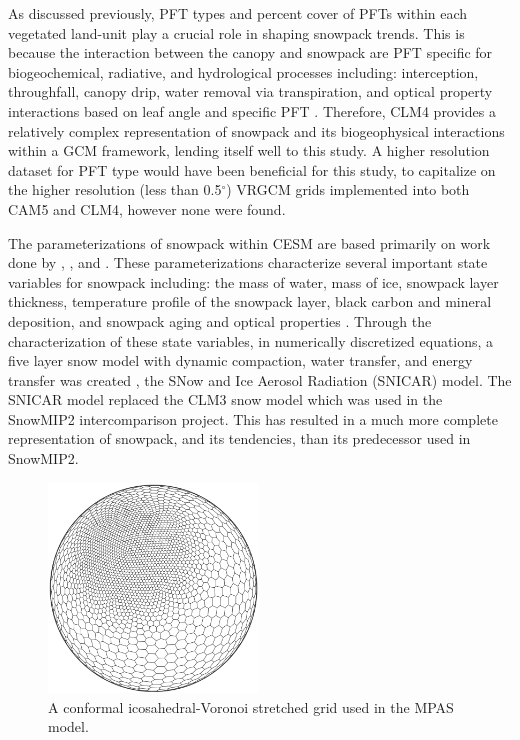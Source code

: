 \documentclass[11pt]{article}
\begin{document}
As discussed previously, PFT types and percent cover of PFTs within each vegetated land-unit play a crucial role in shaping snowpack trends. This is because the interaction between the canopy and snowpack are PFT specific for biogeochemical, radiative, and hydrological processes including: interception, throughfall, canopy drip, water removal via transpiration, and optical property interactions based on leaf angle and specific PFT \citep{lawrence2011parameterization}.  Therefore, CLM4 provides a relatively complex representation of snowpack and its biogeophysical interactions within a GCM framework, lending itself well to this study.   A higher resolution dataset for PFT type would have been beneficial for this study, to capitalize on the higher resolution (less than 0.5$^\circ$) VRGCM grids implemented into both CAM5 and CLM4, however none were found.

The parameterizations of snowpack within CESM are based primarily on work done by \citet{anderson1976point}, \citet{jordan1991one}, and \citet{yongjiu1997land}. These parameterizations characterize several important state variables for snowpack including: the mass of water, mass of ice, snowpack layer thickness, temperature profile of the snowpack layer, black carbon and mineral deposition, and snowpack aging and optical properties \citep{lawrence2011parameterization}. Through the characterization of these state variables, in numerically discretized equations, a five layer snow model with dynamic compaction, water transfer, and energy transfer was created \citep{lawrence2011parameterization}, the SNow and Ice Aerosol Radiation (SNICAR) model.  The SNICAR model replaced the CLM3 snow model which was used in the SnowMIP2 intercomparison project.  This has resulted in a much more complete representation of snowpack, and its tendencies, than its predecessor used in SnowMIP2.

\begin{figure}
\centering\includegraphics[width=2.2in]{RinglerGrid.png}
\caption{A conformal icosahedral-Voronoi stretched grid used in the MPAS model.} \label{fig:MPAS-AdaptedGrid}
\end{figure}
\end{document}
